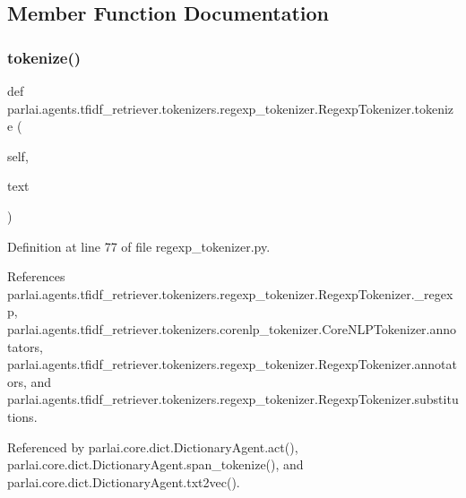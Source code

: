 \subsection{Member Function Documentation}
\mbox{\label{classparlai_1_1agents_1_1tfidf__retriever_1_1tokenizers_1_1regexp__tokenizer_1_1RegexpTokenizer_aed53e2811a6c13818061b300311fde1a}} 
\subsubsection{\texorpdfstring{tokenize()}{tokenize()}}
{\footnotesize\ttfamily def parlai.\+agents.\+tfidf\+\_\+retriever.\+tokenizers.\+regexp\+\_\+tokenizer.\+Regexp\+Tokenizer.\+tokenize (\begin{DoxyParamCaption}\item[{}]{self,  }\item[{}]{text }\end{DoxyParamCaption})}



Definition at line 77 of file regexp\+\_\+tokenizer.\+py.



References parlai.\+agents.\+tfidf\+\_\+retriever.\+tokenizers.\+regexp\+\_\+tokenizer.\+Regexp\+Tokenizer.\+\_\+regexp, parlai.\+agents.\+tfidf\+\_\+retriever.\+tokenizers.\+corenlp\+\_\+tokenizer.\+Core\+N\+L\+P\+Tokenizer.\+annotators, parlai.\+agents.\+tfidf\+\_\+retriever.\+tokenizers.\+regexp\+\_\+tokenizer.\+Regexp\+Tokenizer.\+annotators, and parlai.\+agents.\+tfidf\+\_\+retriever.\+tokenizers.\+regexp\+\_\+tokenizer.\+Regexp\+Tokenizer.\+substitutions.



Referenced by parlai.\+core.\+dict.\+Dictionary\+Agent.\+act(), parlai.\+core.\+dict.\+Dictionary\+Agent.\+span\+\_\+tokenize(), and parlai.\+core.\+dict.\+Dictionary\+Agent.\+txt2vec().

